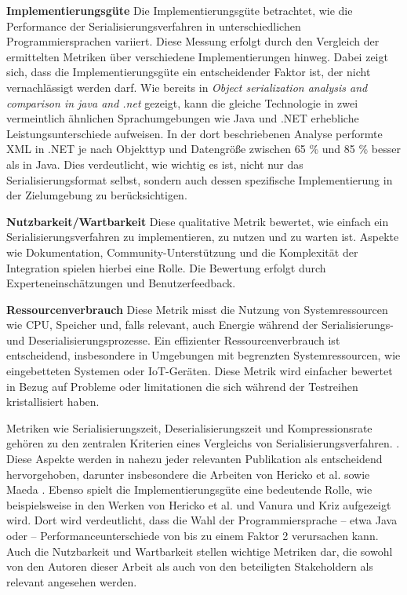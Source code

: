 \documentclass[ngerman]{seminarvorlage}
\begin{document}
\textbf{Implementierungsgüte}\newline
Die Implementierungsgüte betrachtet, wie die Performance der Serialisierungsverfahren in unterschiedlichen Programmiersprachen variiert. Diese Messung erfolgt durch den Vergleich der ermittelten Metriken über verschiedene Implementierungen hinweg. Dabei zeigt sich, dass die Implementierungsgüte ein entscheidender Faktor ist, der nicht vernachlässigt werden darf. Wie bereits in \textit{Object serialization analysis and comparison in java and .net} \cite{10.1145/944579.944589} gezeigt, kann die gleiche Technologie in zwei vermeintlich ähnlichen Sprachumgebungen wie Java und .NET erhebliche Leistungsunterschiede aufweisen. In der dort beschriebenen Analyse performte XML in .NET je nach Objekttyp und Datengröße zwischen 65 \% und 85 \% besser als in Java. Dies verdeutlicht, wie wichtig es ist, nicht nur das Serialisierungsformat selbst, sondern auch dessen spezifische Implementierung in der Zielumgebung zu berücksichtigen.

\textbf{Nutzbarkeit/Wartbarkeit}\newline
Diese qualitative Metrik bewertet, wie einfach ein Serialisierungsverfahren zu implementieren, zu nutzen und zu warten ist. Aspekte wie Dokumentation, Community-Unterstützung und die Komplexität der Integration spielen hierbei eine Rolle. Die Bewertung erfolgt durch Experteneinschätzungen und Benutzerfeedback.

\textbf{Ressourcenverbrauch}\newline
Diese Metrik misst die Nutzung von Systemressourcen wie CPU, Speicher und, falls relevant, auch Energie während der Serialisierungs- und Deserialisierungsprozesse. Ein effizienter Ressourcenverbrauch ist entscheidend, insbesondere in Umgebungen mit begrenzten Systemressourcen, wie eingebetteten Systemen oder IoT-Geräten. Diese Metrik wird einfacher bewertet in Bezug auf Probleme oder limitationen die sich während der Testreihen kristallisiert haben.

Metriken wie Serialisierungszeit, Deserialisierungszeit und Kompressionsrate gehören zu den zentralen Kriterien eines Vergleichs von Serialisierungsverfahren. . Diese Aspekte werden in nahezu jeder relevanten Publikation als entscheidend hervorgehoben, darunter insbesondere die Arbeiten von Hericko et al. \cite{10.1145/944579.944589} sowie Maeda \cite{6215346}. Ebenso spielt die Implementierungsgüte eine bedeutende Rolle, wie beispielsweise in den Werken von Hericko et al. \cite{10.1145/944579.944589} und Vanura und Kriz \cite{vanura2018perfomance} aufgezeigt wird. Dort wird verdeutlicht, dass die Wahl der Programmiersprache – etwa Java oder  – Performanceunterschiede von bis zu einem Faktor 2 verursachen kann. Auch die Nutzbarkeit und Wartbarkeit stellen wichtige Metriken dar, die sowohl von den Autoren dieser Arbeit als auch von den beteiligten Stakeholdern als relevant angesehen werden.
\end{document}
